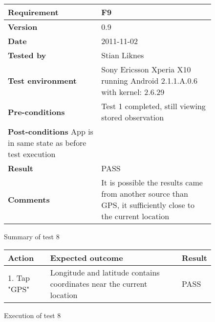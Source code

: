 	\begin{figure}[htb]
		\centering
		\begin{tabular}{|p{3.5cm}|p{7.0cm}|} \hline
			\textbf{Requirement} & F9 \\ \hline
			\textbf{Version} & 0.9 \\ \hline
			\textbf{Date} & 2011-11-02 \\ \hline
			\textbf{Tested by} & Stian Liknes \\ \hline
			\textbf{Test environment} & Sony Ericsson Xperia X10 running Android 2.1.1.A.0.6 with kernel: 2.6.29 \\ \hline
			\textbf{Pre-conditions} & Test 1 completed, still viewing stored observation \\ \hline
			\textbf{Post-conditions} App is in same state as before test execution &  \\ \hline
			\textbf{Result} & PASS \\ \hline
			\textbf{Comments} & It is possible the results came from another
			source than GPS, it sufficiently close to the current location \\
			\hline
		\end{tabular}
		\caption{Summary of test 8}
	\end{figure}

	\begin{figure}[htb]
		\centering
		\begin{tabular}{|p{5.0cm}|p{5.0cm}|p{1cm}|}
			\hline \textbf{Action} & \textbf{Expected outcome} & \textbf{Result} \\ \hline
			
			1. Tap "GPS" &
			Longitude and latitude contains coordinates near the current location &
			PASS \\ \hline

		\end{tabular}
		\caption{Execution of test 8}
	\end{figure}

\newpage

